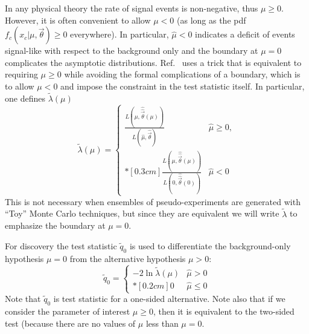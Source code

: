 In any physical theory the rate of signal events is non-negative, thus $\mu\ge 0$.  However, it is often convenient to allow $\mu<0$ (as long as the pdf $f_c(x_c | \mu,\vec\theta)\ge 0$ everywhere).  In particular, $\hat\mu<0$ indicates a deficit of events signal-like with respect to the background only and the boundary at $\mu=0$ complicates the asymptotic distributions.  Ref.~\cite{asimov} uses a  trick that is equivalent to requiring $\mu\ge 0$ while avoiding the formal complications of a boundary, which is to allow $\mu< 0$ and   impose the constraint in the test statistic itself.  In particular, one defines $\tilde \lambda(\mu)$
\begin{equation}
\label{eqn:lambdatilde}  \tilde{\lambda}({\mu}) =  \left\{ 
\begin{array}{ll} \frac{ L(\mu, \hat{\hat{\vec{\theta}}}(\mu)) }
{L(\hat{\mu}, \hat{\vec{\theta}}) } & \hat{\mu} \ge 0 , \\*[0.3 cm]
\frac{ L(\mu, \hat{\hat{\vec{\theta}}}(\mu)) }  {L(0,
\hat{\hat{\vec{\theta}}}(0)) } & \hat{\mu} < 0 
              \end{array} \right.
\end{equation}
This is not necessary when ensembles of pseudo-experiments are generated with ``Toy'' Monte Carlo techniques, but since they are equivalent we will write $\tilde\lambda$ to emphasize the boundary at $\mu=0$.


For discovery the test statistic $\tilde{q}_0$  is used to differentiate the background-only hypothesis $\mu=0$ from the alternative hypothesis $\mu>0$:
\begin{equation}
\tilde{q}_{0} =  \left\{ \!
\! \begin{array}{ll} - 2 \ln \tilde{\lambda}(\mu)  & \hat{\mu} > 0
\\*[0.2 cm] 0 & \hat{\mu} \le 0 
              \end{array} \right.  
\end{equation}
Note that $\tilde{q}_0$ is test statistic for a one-sided alternative.  Note also that if we consider the parameter of interest $\mu\ge 0$, then it is equivalent to the two-sided test (because there are no values of $\mu$ less than $\mu=0$. 


